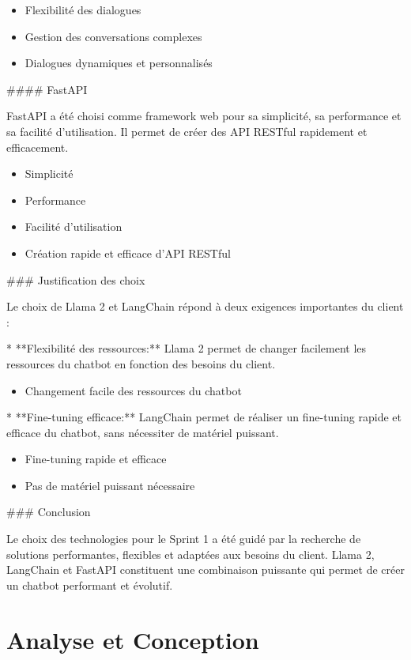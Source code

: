 \documentclass[a4paper, 11pt, openany]{report}
\begin{document}
\begin{itemize}
\item Flexibilité des dialogues
\item Gestion des conversations complexes
\item Dialogues dynamiques et personnalisés
\end{itemize}

#### FastAPI

FastAPI a été choisi comme framework web pour sa simplicité, sa performance et sa facilité d'utilisation. Il permet de créer des API RESTful rapidement et efficacement.

\begin{itemize}
\item Simplicité
\item Performance
\item Facilité d'utilisation
\item Création rapide et efficace d'API RESTful
\end{itemize}

### Justification des choix

Le choix de Llama 2 et LangChain répond à deux exigences importantes du client :

* **Flexibilité des ressources:** Llama 2 permet de changer facilement les ressources du chatbot en fonction des besoins du client.

\begin{itemize}
\item Changement facile des ressources du chatbot
\end{itemize}

* **Fine-tuning efficace:** LangChain permet de réaliser un fine-tuning rapide et efficace du chatbot, sans nécessiter de matériel puissant.

\begin{itemize}
\item Fine-tuning rapide et efficace
\item Pas de matériel puissant nécessaire
\end{itemize}

### Conclusion

Le choix des technologies pour le Sprint 1 a été guidé par la recherche de solutions performantes, flexibles et adaptées aux besoins du client. Llama 2, LangChain et FastAPI constituent une combinaison puissante qui permet de créer un chatbot performant et évolutif.


\section{Analyse et Conception}
\end{document}
